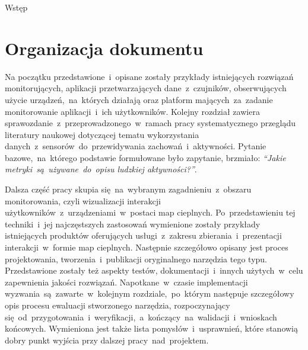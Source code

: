 \begin{chapter}{Wstęp}
	\section{Organizacja dokumentu}
	Na początku przedstawione~i~opisane zostały przykłady istniejących rozwiązań monitorujących, aplikacji przetwarzających dane~z~czujników, obserwujących użycie urządzeń,~na~których działają oraz platform mających~za~zadanie monitorowanie aplikacji~i~ich użytkowników. Kolejny rozdział zawiera sprawozdanie~z~przeprowadzonego~w~ramach pracy systematycznego przeglądu literatury naukowej dotyczącej tematu wykorzystania danych~z~sensorów~do~przewidywania zachowań~i~aktywności. Pytanie bazowe,~na~którego podstawie formułowane było zapytanie, brzmiało: {\it ``Jakie metryki~są~używane~do~opisu ludzkiej aktywności?''}. 
	
	Dalsza część pracy skupia się~na~wybranym zagadnieniu~z~obszaru monitorowania, czyli wizualizacji interakcji użytkowników~z~urządzeniami~w~postaci map cieplnych. Po~przedstawieniu tej techniki~i~jej najczęstszych zastosowań wymienione zostały przykłady istniejących produktów oferujących usługi~z~zakresu zbierania~i~prezentacji interakcji~w~formie map cieplnych. Następnie szczegółowo opisany jest proces projektowania, tworzenia~i~publikacji oryginalnego narzędzia tego typu. Przedstawione zostały też aspekty testów, dokumentacji~i~innych użytych~w~celu zapewnienia jakości rozwiązań. Napotkane~w~czasie implementacji wyzwania~są~zawarte~w~kolejnym rozdziale,~po~którym następuje szczegółowy opis procesu ewaluacji stworzonego narzędzia, rozpoczynający się~od~przygotowania~i~weryfikacji,~a~kończący~na~walidacji~i~wnioskach końcowych. Wymieniona jest także lista pomysłów~i~usprawnień, które stanowią dobry punkt wyjścia przy dalszej pracy~nad~projektem.
\end{chapter}

